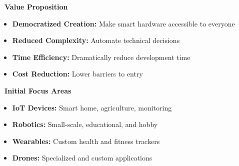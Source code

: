 \begin{center}
\end{center}

\vspace{0.5cm}

\begin{minipage}[t]{0.48\textwidth}
\textbf{\textcolor{fabPrimary}{\faLightbulbO\ Value Proposition}}

\begin{itemize}[leftmargin=*]
    \item \textbf{\textcolor{fabPrimary}{Democratized Creation:}} Make smart hardware accessible to everyone
    \item \textbf{\textcolor{fabPrimary}{Reduced Complexity:}} Automate technical decisions
    \item \textbf{\textcolor{fabPrimary}{Time Efficiency:}} Dramatically reduce development time
    \item \textbf{\textcolor{fabPrimary}{Cost Reduction:}} Lower barriers to entry
\end{itemize}
\end{minipage}
\hfill
\begin{minipage}[t]{0.48\textwidth}
\textbf{\textcolor{fabPrimary}{\faRocket\ Initial Focus Areas}}

\begin{itemize}[leftmargin=*]
    \item \textbf{\textcolor{fabPrimary}{IoT Devices:}} Smart home, agriculture, monitoring
    \item \textbf{\textcolor{fabPrimary}{Robotics:}} Small-scale, educational, and hobby
    \item \textbf{\textcolor{fabPrimary}{Wearables:}} Custom health and fitness trackers
    \item \textbf{\textcolor{fabPrimary}{Drones:}} Specialized and custom applications
\end{itemize}
\end{minipage}

\vspace{0.5cm}

